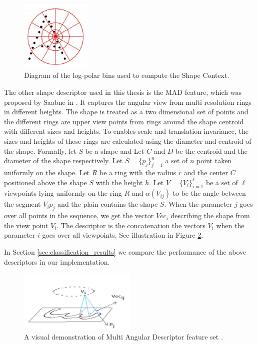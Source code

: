 \begin{figure}
\centering
\includegraphics[width=0.3\textwidth]{./figures/shape_context_online}   
\caption{Diagram of the log-polar bins used to compute the Shape Context.}
\label{fig:shape_context_demo}
\end{figure}

\iftoggle{edit-mode}{\hspace{0pt}\marginpar{MAD}}{}
The other shape descriptor used in this thesis is the MAD feature, which was proposed by Saabne in \cite{saabni2013multi}. 
It captures the angular view from multi resolution rings in different heights. 
The shape is treated as a two dimensional set of points and the different rings are upper view points from rings around the shape centroid with different sizes and heights. 
To enables scale and translation invariance, the sizes and heights of these rings are calculated using the diameter and centroid of the shape.
Formally, let $S$ be a shape and Let $C$ and $D$ be the centroid and the diameter of the shape respectively. 
Let $S = \{p_j\}_{j = 1}^n$ a set of $n$ point taken uniformly on the shape. 
Let $R$ be a ring with the radius $r$ and the center $C$ positioned above the shape $S$ with the height $h$. 
Let $V = \{V_i\}_{i = 1}^\ell$ be a set of $\ell$ viewpoints lying uniformly on the ring $R$ and $\alpha(V_{ij})$ to be the angle between the segment $\overline {{V_i}{p_j}}$ and the plain contains the shape $S$. 
When the parameter $j$ goes over all points in the sequence, we get the vector $Vec_i$ describing the shape from the view point $V_i$.
The descriptor is the concatenation the vectors $V_i$ when the parameter $i$ goes over all viewpoints. 
See illustration in Figure \ref{fig:mad_demo}.

In Section \ref{sec:classification_results} we compare the performance of the above descriptors in our implementation. 

\begin{figure}
\centering
\includegraphics[width=0.5\textwidth]{./figures/mad_demo}       
\caption{A visual demonstration of Multi Angular Descriptor feature set \cite{saabni2013multi}.}
\label{fig:mad_demo}
\end{figure}

